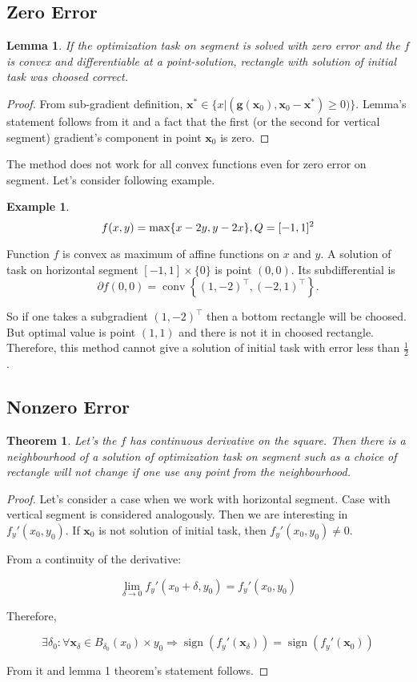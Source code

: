 \documentclass[12pt]{article}
\DeclareMathOperator{\sign}{sign}
\DeclareMathOperator{\conv}{conv}
\newtheorem{theorem}{Theorem}[section]
\newtheorem{lemma}{Lemma}
\begin{document}
\subsection{Zero Error}

\begin{lemma}\label{l1}
If the optimization task on segment is solved with zero error and the $f$ is convex and differentiable at a point-solution, rectangle with solution of initial task was choosed correct.
\end{lemma}
\begin{proof}
From sub-gradient definition, $\textbf{x}^* \in \{x|(\textbf{g}(\textbf{x}_0), \textbf{x}_0 - \textbf{x}^*) \geq 0)\}$. Lemma's statement follows from it and a fact that the first (or the second for vertical segment) gradient's component in point $\textbf{x}_0$ is zero.
\end{proof}

The method does not work for all convex functions even for zero error on segment. Let's consider following example.

\textbf{Example 1}.
\begin{equation}
f(x,y) = \max\{x-2y, y-2x\}, \\
Q = [-1, 1]^2
\end{equation}

Function $f$ is convex as maximum of affine functions on $x$ and $y$. A solution of task on horizontal segment $[-1, 1]\times\{0\}$ is point $(0, 0)$. Its subdifferential is $$\partial f(0,0) = \conv\left\{(1, -2)^\top, (-2,1)^\top\right\}.$$ 

So if one takes a subgradient $(1,-2)^\top$ then a bottom rectangle will be choosed. But optimal value is point $(1,1)$ and there is not it in choosed rectangle. Therefore, this method cannot give a solution of initial task with error less than $\frac{1}{2}$.
\subsection{Nonzero Error}
\begin{theorem}
Let's the $f$ has continuous derivative on the square. Then there is a neighbourhood of a solution of optimization task on segment such as a choice of rectangle will not change if one use any point from the   neighbourhood.
\end{theorem}
\begin{proof}
Let's consider a case when we work with horizontal segment. Case with vertical segment is considered analogously. Then we are interesting in $f_y'(x_0, y_0)$. If $\textbf{x}_0$ is not solution of initial task, then $f_y'(x_0, y_0) \neq 0$. 

From a continuity of the derivative:

$$\lim\limits_{\delta \rightarrow 0}f_y'(x_0+\delta, y_0) = f_y'(x_0, y_0)$$

Therefore, 

$$\exists \delta_0:\forall \textbf{x}_\delta\in B_{\delta_0}(x_0)\times y_0\Rightarrow \sign(f_y'(\textbf{x}_\delta)) = \sign(f_y'(\textbf{x}_0))$$

From it and lemma 1 theorem's statement follows.

\end{proof}
\end{document}
